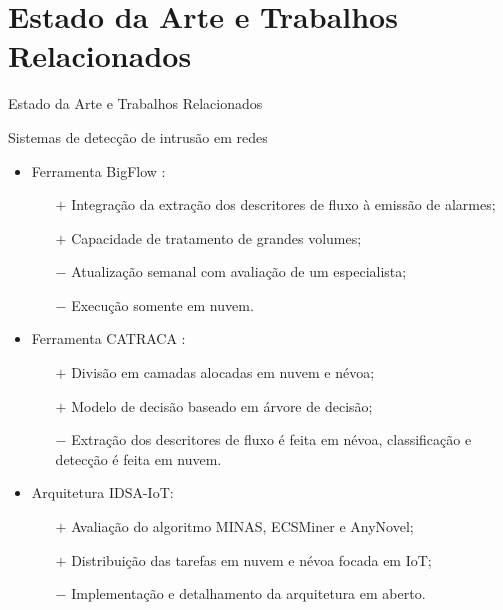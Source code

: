 \documentclass[aspectratio=1610,10pt]{beamer}
\newcommand{\nota}[1]{\hspace*{-0.5cm}\textit{{\color[rgb]{1,0,0}Nota: #1}}}
\begin{document}

\section{Estado da Arte e Trabalhos Relacionados}
\newcommand{\arch}{IDSA-IoT\xspace}

\begin{frame}[fragile]{Estado da Arte e Trabalhos Relacionados}
\begin{alertblock}{Sistemas de detecção de intrusão em redes}
  \begin{itemize}
    \item Ferramenta BigFlow \cite{Viegas2019}:
    \begin{itemize}
      \item[$\boldsymbol{+}$] Integração da extração dos descritores de fluxo à emissão de alarmes;
      \item[$\boldsymbol{+}$] Capacidade de tratamento de grandes volumes;
      \item[$\boldsymbol{-}$] Atualização semanal com avaliação de um especialista;
      \item[$\boldsymbol{-}$] Execução somente em nuvem.
    \end{itemize}
    \item Ferramenta CATRACA \cite{Lopez2018,Sanz2018}:
    \begin{itemize}
      \item[$\boldsymbol{+}$] Divisão em camadas alocadas em nuvem e névoa;
      \item[$\boldsymbol{+}$] Modelo de decisão baseado em árvore de decisão;
      \item[$\boldsymbol{-}$] Extração dos descritores de fluxo é feita em
      névoa, classificação e detecção é feita em nuvem.
    \end{itemize}
    \item Arquitetura \arch \cite{Cassales2019a}:
    \begin{itemize}
      \item[$+$] Avaliação do algoritmo MINAS, ECSMiner e AnyNovel;
      \item[$+$] Distribuição das tarefas em nuvem e névoa focada em IoT;
      \item[$-$] Implementação e detalhamento da arquitetura em aberto.
    \end{itemize}
  \end{itemize}
\end{alertblock}
\end{frame}
\end{document}
